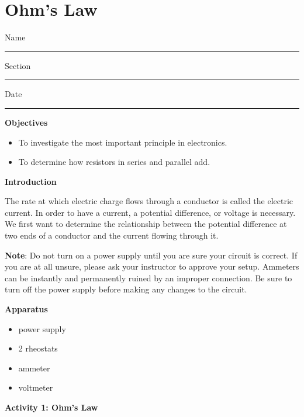 
\section{Ohm's Law}

Name \rule{2.0in}{0.1pt}\hfill{}Section \rule{1.0in}{0.1pt}\hfill{}Date
\rule{1.0in}{0.1pt}

\textbf{Objectives}

\begin{itemize}
\item To investigate the most important principle in electronics.
\item To determine how resistors in series and parallel add.
\end{itemize}
\textbf{Introduction}

The rate at which electric charge flows through a conductor is called
the electric current. In order to have a current, a potential difference,
or voltage is necessary. We first want to determine the relationship
between the potential difference at two ends of a conductor and the
current flowing through it.

\textbf{Note}: Do not turn on a power supply until you are sure your
circuit is correct. If you are at all unsure, please ask your instructor
to approve your setup. Ammeters can be instantly and permanently ruined
by an improper connection. Be sure to turn off the power supply before
making any changes to the circuit.

\textbf{Apparatus}

\begin{itemize}
\item power supply
\item 2 rheostats
\item ammeter
\item voltmeter
\end{itemize}
\textbf{Activity 1: Ohm's Law}

